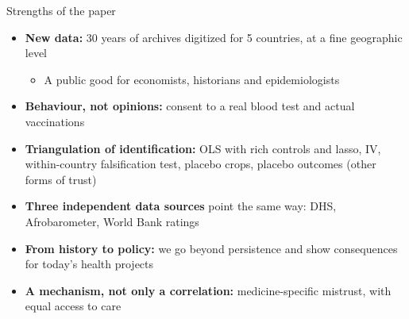 \documentclass[aspectratio=1610]{beamer}
\begin{document}
\begin{frame}{Strengths of the paper}
  \begin{itemize}
    \item \textbf{New data:} 30 years of archives digitized for 5 countries, at a fine geographic level
      \begin{itemize}
        \item A public good for economists, historians and epidemiologists
      \end{itemize}
    \item \textbf{Behaviour, not opinions:} consent to a real blood test and actual vaccinations
    \item \textbf{Triangulation of identification:} OLS with rich controls and lasso, IV,
      within-country falsification test, placebo crops, placebo outcomes (other forms of trust)
    \item \textbf{Three independent data sources} point the same way:
      DHS, Afrobarometer, World Bank ratings
    \item \textbf{From history to policy:} we go beyond persistence and show consequences for
      today's health projects
    \item \textbf{A mechanism, not only a correlation:} medicine-specific mistrust, with equal access to care
  \end{itemize}
\end{frame}
\end{document}
